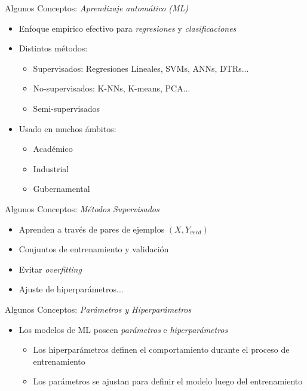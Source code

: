 \documentclass[10pt]{beamer}
\begin{document}
\begin{frame}{Algunos Conceptos: \textit{Aprendizaje automático (ML)}}
\begin{itemize}[<+->]
  \item Enfoque empírico efectivo para \textit{regresiones} y \textit{clasificaciones}
  \item Distintos métodos:
    \begin{itemize}
      \item Supervisados: Regresiones Lineales, SVMs, ANNs, DTRs...
      \item No-supervisados: K-NNs, K-means, PCA...
      \item Semi-supervisados
    \end{itemize}
  \item Usado en muchos ámbitos:
  \begin{itemize}
    \item Académico
    \item Industrial
    \item Gubernamental
  \end{itemize}

\end{itemize}
\end{frame}



\begin{frame}{Algunos Conceptos: \textit{Métodos Supervisados}}
\begin{itemize}[<+->]
  \item Aprenden a través de pares de ejemplos $(X, Y_{verd})$
  \item Conjuntos de entrenamiento y validación
  \item Evitar \textit{overfitting}
  \item Ajuste de hiperparámetros...
\end{itemize}
\end{frame}

\begin{frame}{Algunos Conceptos: \textit{Parámetros y Hiperparámetros}}
  \begin{itemize}
    \item Los modelos de ML poseen \textit{parámetros} e \textit{hiperparámetros}
    \begin{itemize}[<+->]
      \item Los hiperparámetros definen el comportamiento durante el proceso de entrenamiento
      \item Los parámetros se ajustan para definir el modelo luego del entrenamiento
    \end{itemize}

  \end{itemize}
\end{frame}
\end{document}
